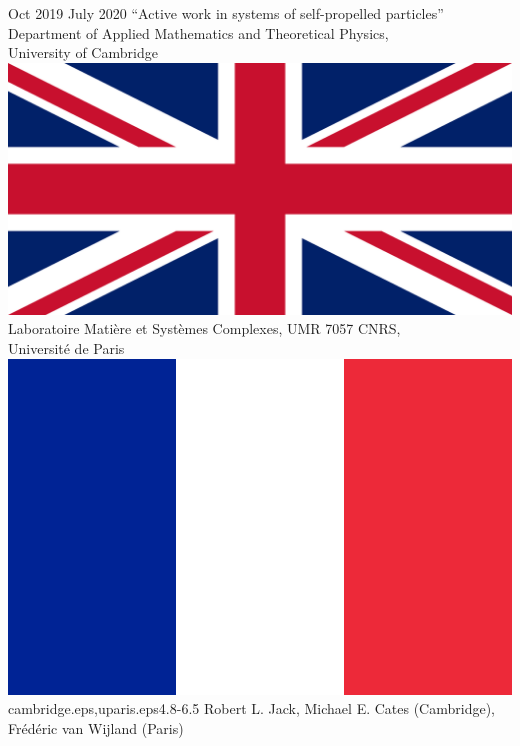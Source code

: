 \documentclass[letterpaper]{cvtemplate_en} %
\begin{document}
\begin{cvbody}
\cvitem
	{Oct 2019}
	{July 2020}
  {``Active work in systems of self-propelled particles''}
  {Department of Applied Mathematics and Theoretical Physics,\\ University of Cambridge \includegraphics[height=0.8\myheight]{uk}\\
	Laboratoire Mati\`ere et Syst\`emes Complexes, UMR 7057 CNRS,\\ Universit\'e de Paris \includegraphics[height=0.8\myheight]{fr}}
  {cambridge.eps,uparis.eps}{4.8}{-6.5}
	{Robert L. Jack, Michael E. Cates (Cambridge),\\ Fr\'ed\'eric van Wijland (Paris)}
  {\\}


\end{cvbody}
\end{document}
